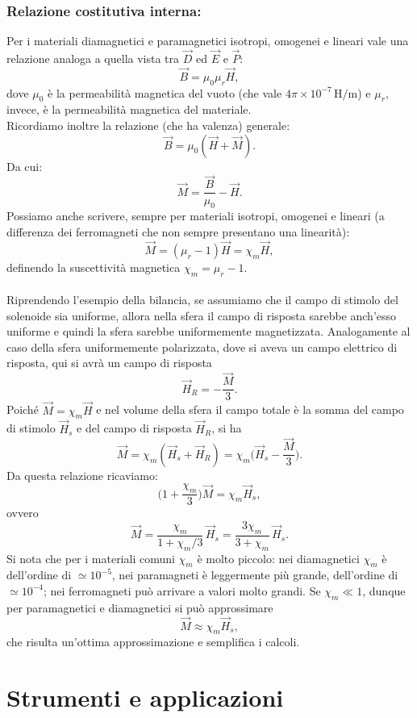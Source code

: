 \documentclass{book}
\begin{document}
\subsection{Relazione costitutiva interna:}
Per i materiali diamagnetici e paramagnetici isotropi, omogenei e lineari   vale una relazione analoga a quella vista tra \(\vec{D}\) ed \(\vec{E}\) e \(\vec{P}\):
\[
\vec{B} = \mu_0 \mu_r \vec{H},
\]
 dove $\mu_0$ è la permeabilità magnetica del vuoto (che vale $4\pi \times 10^{-7}\,\text{H/m}$) e  $\mu_r$, invece, è la permeabilità magnetica del materiale.
\\
Ricordiamo inoltre la relazione  (che ha valenza) generale:
\[
\vec{B} = \mu_0(\vec{H}+\vec{M}).
\]
Da cui:
\[
\vec{M} = \frac{\vec{B}}{\mu_0}-\vec{H}.
\]
 Possiamo anche scrivere, sempre per materiali isotropi, omogenei e lineari (a differenza dei ferromagneti che non sempre presentano una linearità):
\[
\vec{M} = (\mu_r-1)\vec{H} = \chi_m \vec{H},
\]
definendo la suscettività magnetica \(\chi_m = \mu_r - 1\).
\\
\\
Riprendendo l'esempio della bilancia, se assumiamo che il campo di stimolo del solenoide sia uniforme, allora nella sfera il campo di risposta sarebbe anch'esso uniforme e quindi la sfera sarebbe uniformemente magnetizzata. Analogamente al caso della sfera uniformemente polarizzata, dove si aveva un campo elettrico di risposta, qui si avrà un campo di risposta
\[
\vec{H}_R = -\frac{\vec{M}}{3}.
\]
Poiché \(\vec{M}=\chi_m\vec{H}\) e nel volume della sfera il campo totale è la somma del campo di stimolo \(\vec{H}_s\) e del campo di risposta \(\vec{H}_R\), si ha
\[
\vec{M} = \chi_m(\vec{H}_s + \vec{H}_R) = \chi_m\Big(\vec{H}_s - \frac{\vec{M}}{3}\Big).
\]
Da questa relazione ricaviamo:
\[
\Big(1+\frac{\chi_m}{3}\Big)\vec{M} = \chi_m \vec{H}_s,
\]
ovvero
\[
\vec{M} = \frac{\chi_m}{1+\chi_m/3}\,\vec{H}_s = \frac{3\chi_m}{3+\chi_m}\,\vec{H}_s.
\]
Si nota che per i materiali comuni \(\chi_m\) è molto piccolo: nei diamagnetici \(\chi_m\) è dell'ordine di \(\simeq 10^{-5}\), nei paramagneti è leggermente più grande, dell'ordine di \(\simeq 10^{-4}\); nei ferromagneti può arrivare a valori molto grandi. Se \(\chi_m \ll 1\), dunque per paramagnetici e diamagnetici si può approssimare
\[
\vec{M}\approx \chi_m \vec{H}_s,
\]
che risulta un'ottima approssimazione e semplifica i calcoli.



\chapter{Strumenti e applicazioni}
\end{document}
